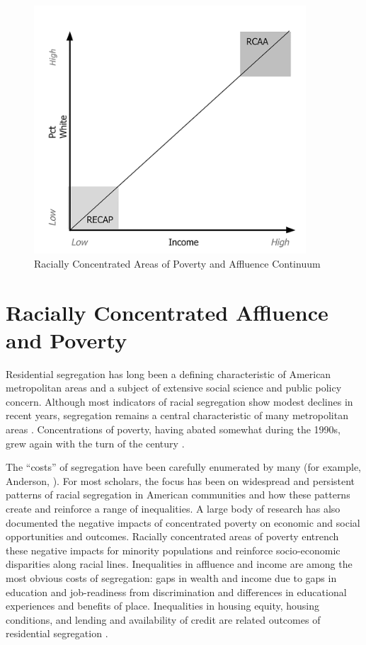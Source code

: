\documentclass[11pt,]{article}
\begin{document}
\begin{figure}
\includegraphics[width=4in]{./RCAP-RCAA-Continuum} \caption{Racially Concentrated Areas of Poverty and Affluence Continuum}\label{fig:fig1}
\end{figure}

\hypertarget{racially-concentrated-affluence-and-poverty}{%
\section{Racially Concentrated Affluence and
Poverty}\label{racially-concentrated-affluence-and-poverty}}

Residential segregation has long been a defining characteristic of
American metropolitan areas and a subject of extensive social science
and public policy concern. Although most indicators of racial
segregation show modest declines in recent years, segregation remains a
central characteristic of many metropolitan areas
\autocite{lichter2015toward,logan2011persistence}. Concentrations of
poverty, having abated somewhat during the 1990s, grew again with the
turn of the century \autocite{anacker2015kn}.

The ``costs'' of segregation have been carefully enumerated by many (for
example, Anderson, \autocite*{anderson2010}). For most scholars, the
focus has been on widespread and persistent patterns of racial
segregation in American communities and how these patterns create and
reinforce a range of inequalities. A large body of research has also
documented the negative impacts of concentrated poverty on economic and
social opportunities and outcomes. Racially concentrated areas of
poverty entrench these negative impacts for minority populations and
reinforce socio-economic disparities along racial lines. Inequalities in
affluence and income are among the most obvious costs of segregation:
gaps in wealth and income due to gaps in education and job-readiness
from discrimination and differences in educational experiences and
benefits of place. Inequalities in housing equity, housing conditions,
and lending and availability of credit are related outcomes of
residential segregation \autocite{lipsitz2006possessive}.
\end{document}
